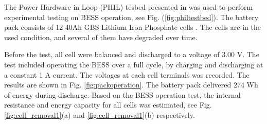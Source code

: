 \documentclass[10pt,twocolumn]{IEEEtran}
\begin{document}
The Power Hardware in Loop (PHIL) tesbed  presented in \cite{PHIL} was used to perform experimental testing on BESS operation, see Fig. (\ref{fig:philtestbed}). 
The battery pack consists of 12  40Ah GBS Lithium Iron Phosphate cells \cite{elitepower}. 
The cells are in the used condition, and several of them have degraded over time. 


Before the test, all cell were balanced and discharged to a voltage of 3.00 V. 
The test included operating the BESS over a full cycle, by charging and discharging at a constant 1 A current.  %
The voltages  at each cell terminals  was  recorded. %
The results are shown in Fig.  \ref{fig:packoperation}.
The battery pack delivered 274 Wh of energy during discharge.
Based on the BESS operation test, the  internal resistance and energy capacity for all cells was estimated, see  Fig. \ref{fig:cell_removal1}(a) and \ref{fig:cell_removal1}(b) respectively.






%
\end{document}
